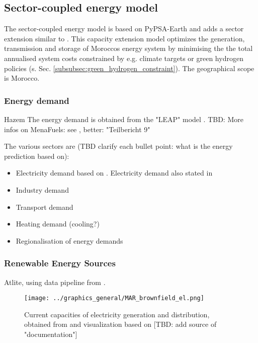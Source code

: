 \subsection{Sector-coupled energy model}
\label{subsec:moroccan_model}

The sector-coupled energy model is based on PyPSA-Earth \cite{Parzen2022} and adds a sector extension similar to \cite{Brown2018a}.
This capacity extension model optimizes the generation, transmission and storage of Moroccos energy system by minimising the the total annualised system costs
constrained by e.g. climate targets or green hydrogen policies (s. Sec. \ref{subsubsec:green_hydrogen_constraint}). The geographical scope is Morocco.

\subsubsection{Energy demand}
Hazem
The energy demand is obtained from the "LEAP" model \cite{Heaps2022}.
TBD: More infos on MenaFuels: see \cite[p. 35]{Ersoy2022}, better: "Teilbericht 9"

The various sectors are (TBD clarify each bullet point: what is the energy prediction based on):
\begin{itemize}
    \item Electricity demand based on \cite{Parzen2022}. Electricity demand also stated in \cite[primary source 25]{Boulakhbar2020}
    \item Industry demand
    \item Transport demand
    \item Heating demand (cooling?) 
    \item Regionalisation of energy demands
\end{itemize}



\subsubsection{Renewable Energy Sources}
Atlite, using data pipeline from \cite{Parzen2022}.





\begin{figure}[h!]
    \centering
    \texttt{[image: ../graphics\_general/MAR\_brownfield\_el.png]}
    \caption{Current capacities of electricity generation and distribution, obtained from \cite{Parzen2022} and visualization based on [TBD: add source of "documentation"]}
    \label{fig:MAR_brownfield}
\end{figure}


